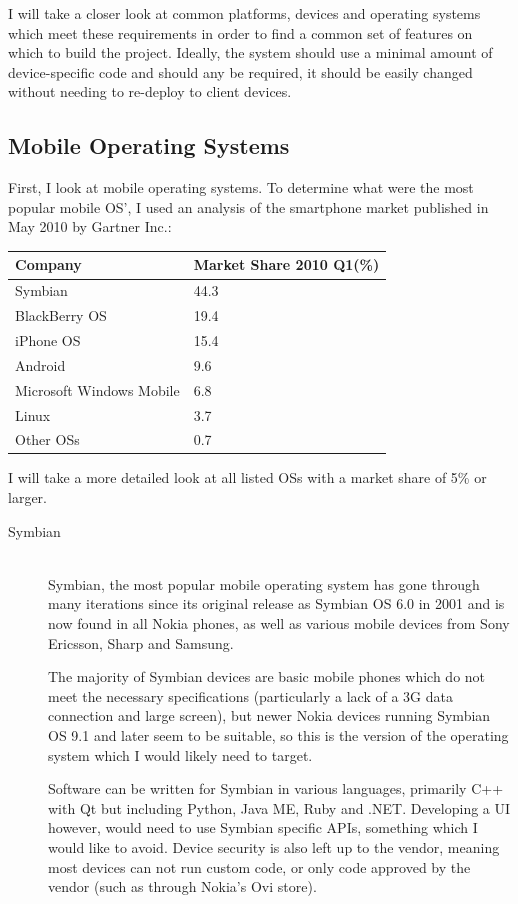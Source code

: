 \documentclass[a4papert,11pt,notitlepage]{article}
\begin{document}
\begin{appendices}
I will take a closer look at common platforms, devices and operating systems which meet these requirements in order to find a common set of features on which to build the project. Ideally, the system should use a minimal amount of device-specific code and should any be required, it should be easily changed without needing to re-deploy to client devices.

\subsection{Mobile Operating Systems}
First, I look at mobile operating systems. To determine what were the most popular mobile OS', I used an analysis of the smartphone market published in May 2010 by Gartner Inc.\cite{gartner:mobile}:

\begin{tabular}{l l}
Company & Market Share 2010 Q1(\%) \\
\hline
Symbian & 44.3 \\
BlackBerry OS & 19.4 \\
iPhone OS & 15.4 \\
Android & 9.6 \\
Microsoft Windows Mobile & 6.8 \\
Linux & 3.7 \\
Other OSs & 0.7 \\
\end{tabular}

I will take a more detailed look at all listed OSs with a market share of 5\% or larger. 

\begin{description}
\item[Symbian] \hfill \\
Symbian\cite{symbian:web}, the most popular mobile operating system has gone through many iterations since its original release as Symbian OS 6.0 in 2001 and is now found in all Nokia phones, as well as various mobile devices from Sony Ericsson, Sharp and Samsung.

The majority of Symbian devices are basic mobile phones which do not meet the necessary specifications (particularly a lack of a 3G data connection and large screen), but newer Nokia devices running Symbian OS 9.1 and later seem to be suitable, so this is the version of the operating system which I would likely need to target.

Software can be written for Symbian in various languages, primarily C++ with Qt but including Python, Java ME, Ruby and .NET. Developing a UI however, would need to use Symbian specific APIs, something which I would like to avoid. Device security is also left up to the vendor, meaning most devices can not run custom code, or only code approved by the vendor (such as through Nokia's Ovi store).


\end{description}
\end{appendices}
\end{document}
